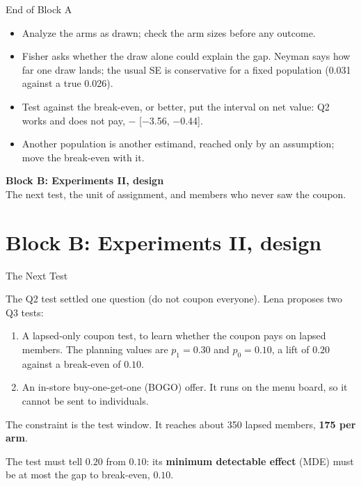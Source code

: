 \documentclass[aspectratio=169, 11pt, handout]{beamer}
\begin{document}
\begin{frame}{End of Block A}

\begin{itemize}
  \item Analyze the arms as drawn; check the arm sizes before any outcome.
  \item Fisher asks whether the draw alone could explain the gap. Neyman says how far one draw lands; the usual SE is conservative for a fixed population (0.031 against a true 0.026).
  \item Test against the break-even, or better, put the interval on net value: Q2 works and does not pay, $-$ [$-$3.56, $-$0.44].
  \item Another population is another estimand, reached only by an assumption; move the break-even with it.
\end{itemize}

\vfill

\begin{center}
\Large \textbf{Block B: Experiments II, design}\\[0.4em]
\normalsize The next test, the unit of assignment, and members who never saw the coupon.
\end{center}
\vfill
\end{frame}

\section{Block B: Experiments II, design}

\begin{frame}{The Next Test}

The Q2 test settled one question (do not coupon everyone). Lena proposes two Q3 tests:

\begin{enumerate}
    \item A lapsed-only coupon test, to learn whether the coupon pays on lapsed members. The planning values are $p_1 = 0.30$ and $p_0 = 0.10$, a lift of $0.20$ against a break-even of $0.10$.
    \item An in-store buy-one-get-one (BOGO) offer. It runs on the menu board, so it cannot be sent to individuals.
\end{enumerate}

\bigskip

The constraint is the test window. It reaches about 350 lapsed members, \textbf{175 per arm}.

\bigskip

\begin{center}
The test must tell $0.20$ from $0.10$: its \textbf{minimum detectable effect} (MDE) must be at most the gap to break-even, $0.10$.
\end{center}
\end{frame}
\end{document}
